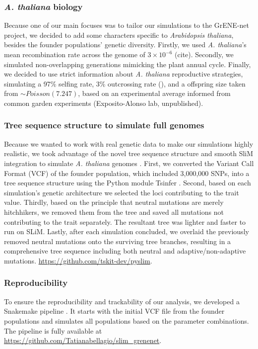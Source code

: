 \documentclass{article}
\begin{document}
\subsubsection{\textit{A. thaliana} biology}
Because one of our main focuses was to tailor our simulations to the GrENE-net project, we decided to add some characters specific to \textit{Arabidopsis thaliana}, besides the founder populations' genetic diversity. Firstly, we used \textit{A. thaliana}'s mean recombination rate across the genome of $3 \times 10^{-6}$ (cite). Secondly, we simulated non-overlapping generations mimicking the plant annual cycle. Finally, we decided to use strict information about \textit{A. thaliana} reproductive strategies, simulating a 97\% selfing rate, 3\% outcrossing rate (\citep{Platt2010-hy}), and a offspring size taken from $\sim Poisson(7.247)$, based on an experimental average informed from common garden experiments (Exposito-Alonso lab, unpublished). 

\subsubsection{Tree sequence structure to simulate full genomes}
Because we wanted to work with real genetic data to make our simulations highly realistic, we took advantage of the novel tree sequence structure and smooth SliM integration to simulate \textit{A. thaliana} genomes \citep{Kelleher2018-jb, Haller2019-lm}. First, we converted the Variant Call Format (VCF) of the founder population, which included 3,000,000 SNPs, into a tree sequence structure using the Python module Tsinfer \citep{Kelleher2019-ev}. Second, based on each simulation's genetic architecture we selected the loci contributing to the trait value. Thirdly, based on the principle that neutral mutations are merely hitchhikers, we removed them from the tree and saved all mutations not contributing to the trait separately. The resultant tree was lighter and faster to run on SLiM. Lastly, after each simulation concluded, we overlaid the previously removed neutral mutations onto the surviving tree branches, resulting in a comprehensive tree sequence including both neutral and adaptive/non-adaptive mutations.
\url{https://github.com/tskit-dev/pyslim}. 

\subsubsection{Reproducibility}
To ensure the reproducibility and trackability of our analysis, we developed a Snakemake pipeline \citep{Molder2021-ho}. It starts with the initial VCF file from the founder populations and simulates all populations based on the parameter combinations. The pipeline is fully available at \url{https://github.com/Tatianabellagio/slim_grenenet}.
\end{document}
